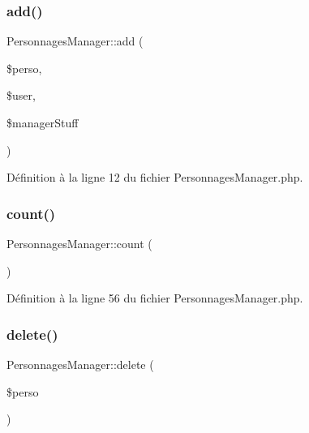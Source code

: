 \subsubsection{\texorpdfstring{add()}{add()}}
{\footnotesize\ttfamily Personnages\+Manager\+::add (\begin{DoxyParamCaption}\item[{\mbox{\hyperlink{class_base__personnage}{Base\+\_\+personnage}}}]{\$perso,  }\item[{\mbox{\hyperlink{class_user}{User}}}]{\$user,  }\item[{\mbox{\hyperlink{class_stuff_manager}{Stuff\+Manager}}}]{\$manager\+Stuff }\end{DoxyParamCaption})}



Définition à la ligne 12 du fichier Personnages\+Manager.\+php.

\mbox{\label{class_personnages_manager_a8f6dfe7defa71cebda7abe39c6aecf83}} 
\subsubsection{\texorpdfstring{count()}{count()}}
{\footnotesize\ttfamily Personnages\+Manager\+::count (\begin{DoxyParamCaption}{ }\end{DoxyParamCaption})}



Définition à la ligne 56 du fichier Personnages\+Manager.\+php.

\mbox{\label{class_personnages_manager_a2c8f754617cbf40ff851a1c91fb7ea9b}} 
\subsubsection{\texorpdfstring{delete()}{delete()}}
{\footnotesize\ttfamily Personnages\+Manager\+::delete (\begin{DoxyParamCaption}\item[{\mbox{\hyperlink{class_personnage}{Personnage}}}]{\$perso }\end{DoxyParamCaption})}



